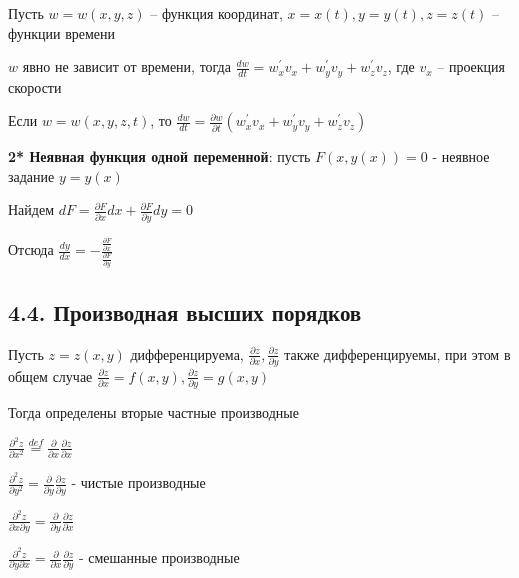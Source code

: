 \documentclass[12pt]{article}
\begin{document}
        \Ex Пусть $\displaystyle w = w(x, y, z)$ -- функция координат, $\displaystyle x = x(t), y = y(t), z = z(t)$ -- функции времени

        $\displaystyle w$ явно не зависит от времени, тогда $\displaystyle \frac{dw}{dt} = w^\prime_x v_x + w^\prime_y v_y + w^\prime_z v_z$, где $\displaystyle v_x$ -- проекция скорости

    Если $\displaystyle w = w(x, y, z, t)$, то $\displaystyle \frac{dw}{dt} = \frac{\partial w}{\partial t} (w^\prime_x v_x + w^\prime_y v_y + w^\prime_z v_z)$
    
    \vspace{3mm}
    
    \textbf{2* Неявная функция одной переменной}: пусть $\displaystyle F(x, y(x)) = 0$ - неявное задание $\displaystyle y = y(x)$

    Найдем $\displaystyle dF = \frac{\partial F}{\partial x} dx + \frac{\partial F}{\partial y} dy = 0$

    Отсюда $\displaystyle \frac{dy}{dx} = -\frac{\frac{\partial F}{\partial x}}{\frac{\partial F}{\partial y}}$
    

    \subsection{4.4. Производная высших порядков}

    \hypertarget{secondderivativeoffunctionoftwovariables}{}

    \Nota Пусть $\displaystyle z = z(x, y)$ дифференцируема, $\displaystyle \frac{\partial z}{\partial x}, \frac{\partial z}{\partial y}$ также дифференцируемы, при этом в общем случае
    $\displaystyle \frac{\partial z}{\partial x} = f(x, y), \frac{\partial z}{\partial y} = g(x, y)$

    Тогда определены вторые частные производные
    
    \vspace{3mm}

    \Def $\displaystyle \frac{\partial^2 z}{\partial x^2} \stackrel{def}{=} \frac{\partial}{\partial x} \frac{\partial z}{\partial x}$

    $\displaystyle \frac{\partial^2 z}{\partial y^2} = \frac{\partial}{\partial y} \frac{\partial z}{\partial y}$ - чистые производные


    $\displaystyle \frac{\partial^2 z}{\partial x \partial y} = \frac{\partial}{\partial y} \frac{\partial z}{\partial x}$

    $\displaystyle \frac{\partial^2 z}{\partial y \partial x} = \frac{\partial}{\partial x} \frac{\partial z}{\partial y}$ - смешанные производные
\end{document}
